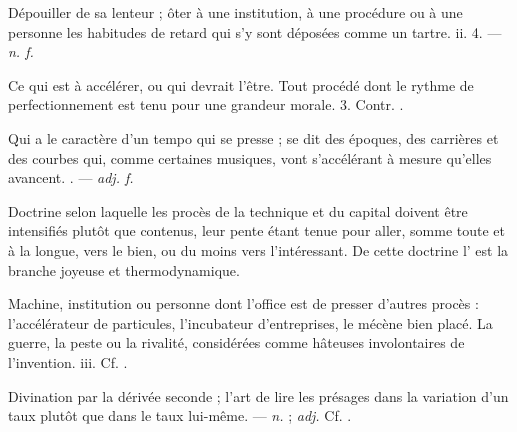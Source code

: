  Dépouiller de sa lenteur ; ôter à une institution, à une procédure ou à une personne les habitudes de retard qui s'y sont déposées comme un tartre.   ii. 4. ---  \textit{n. f.}

  Ce qui est à accélérer, ou qui devrait l'être.   Tout procédé dont le rythme de perfectionnement est tenu pour une grandeur morale.   3. Contr. .

 Qui a le caractère d'un tempo qui se presse ; se dit des époques, des carrières et des courbes qui, comme certaines musiques, vont s'accélérant à mesure qu'elles avancent. . ---  \textit{adj. f.}

 Doctrine selon laquelle les procès de la technique et du capital doivent être intensifiés plutôt que contenus, leur pente étant tenue pour aller, somme toute et à la longue, vers le bien, ou du moins vers l'intéressant. De cette doctrine l' est la branche joyeuse et thermodynamique.

  Machine, institution ou personne dont l'office est de presser d'autres procès : l'accélérateur de particules, l'incubateur d'entreprises, le mécène bien placé.   La guerre, la peste ou la rivalité, considérées comme hâteuses involontaires de l'invention.   iii. Cf. .

 Divination par la dérivée seconde ; l'art de lire les présages dans la variation d'un taux plutôt que dans le taux lui-même.  ---  \textit{n.} ;  \textit{adj.} Cf. .

